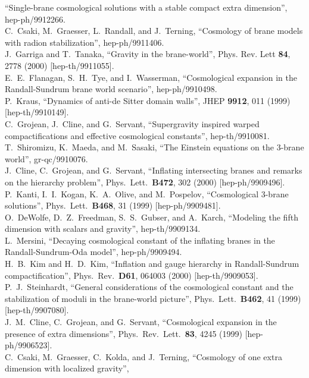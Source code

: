\documentclass[a4paper,12pt]{article}
\begin{document}
\begin{thebibliography}{99}
``Single-brane cosmological solutions with a stable compact extra  dimension'',
hep-ph/9912266.
\\
C.~Csaki, M.~Graesser, L.~Randall, and J.~Terning,
``Cosmology of brane models with radion stabilization'',
hep-ph/9911406.
\\
J.~Garriga and T.~Tanaka,
``Gravity in the brane-world'',
Phys. Rev. Lett {\bf 84}, 2778 (2000)
[hep-th/9911055].
\\
E.~E.~Flanagan, S.~H.~Tye, and I.~Wasserman,
``Cosmological expansion in the Randall-Sundrum brane world scenario'',
hep-ph/9910498.
\\
P.~Kraus,
``Dynamics of anti-de Sitter domain walls'',
JHEP {\bf 9912}, 011 (1999)
[hep-th/9910149].
\\
C.~Grojean, J.~Cline, and G.~Servant,
``Supergravity inspired warped compactifications and effective  
cosmological constants'',
hep-th/9910081.
\\
T.~Shiromizu, K.~Maeda, and M.~Sasaki,
``The Einstein equations on the 3-brane world'',
gr-qc/9910076.
\\
J.~Cline, C.~Grojean, and G.~Servant,
``Inflating intersecting branes and remarks on the hierarchy problem'',
Phys.\ Lett.\  {\bf B472}, 302 (2000)
[hep-ph/9909496].
\\
P.~Kanti, I.~I.~Kogan, K.~A.~Olive, and M.~Pospelov,
``Cosmological 3-brane solutions'',
Phys.\ Lett.\  {\bf B468}, 31 (1999)
[hep-ph/9909481].
\\
O.~DeWolfe, D.~Z.~Freedman, S.~S.~Gubser, and A.~Karch,
``Modeling the fifth dimension with scalars and gravity'',
hep-th/9909134.
\\
L.~Mersini,
``Decaying cosmological constant of the inflating branes in the  
Randall-Sundrum-Oda model'',
hep-ph/9909494.
\\
H.~B.~Kim and H.~D.~Kim,
``Inflation and gauge hierarchy in Randall-Sundrum compactification'',
Phys.\ Rev.\  {\bf D61}, 064003 (2000)
[hep-th/9909053].
\\
P.~J.~Steinhardt,
``General considerations of the cosmological constant and the  
stabilization of moduli in the brane-world picture'',
Phys.\ Lett.\  {\bf B462}, 41 (1999)
[hep-th/9907080].
\\
J.~M.~Cline, C.~Grojean, and G.~Servant,
``Cosmological expansion in the presence of extra dimensions'',
Phys.\ Rev.\ Lett.\  {\bf 83}, 4245 (1999)
[hep-ph/9906523].
\\
C.~Csaki, M.~Graesser, C.~Kolda, and J.~Terning,
``Cosmology of one extra dimension with localized gravity'',

\end{thebibliography}
\end{document}
